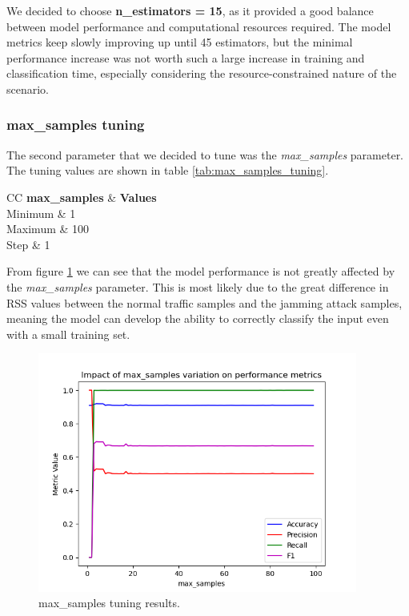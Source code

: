 \documentclass[futureinternet,article,submit,pdftex,moreauthors]{Definitions/mdpi}
\begin{document}
We decided to choose \textbf{n\_estimators = 15}, as it provided a good balance between model performance and computational resources required.
The model metrics keep slowly improving up until 45 estimators, but the minimal performance increase was not worth such a large increase in training and classification time, especially considering the resource-constrained nature of the scenario. 

\subsubsection{max\_samples tuning}

The second parameter that we decided to tune was the \textit{max\_samples} parameter. The tuning values are shown in table \ref{tab:max_samples_tuning}.

\begin{table}[H]
	\caption{max\_samples tuning values.}\label{tab:max_samples_tuning}
	\begin{tabularx}{\textwidth}{CC}
	\toprule
	\textbf{max\_samples} & \textbf{Values} \\
	\midrule
	Minimum & 1 \\
	Maximum & 100 \\
	Step & 1 \\
	\bottomrule
\end{tabularx}
\end{table}

From figure \ref{fig:max_samples_tuning} we can see that the model performance is not greatly affected by the \textit{max\_samples} parameter. This is most likely due to the great difference in RSS values between the normal traffic samples and the jamming attack samples, meaning the model can develop the ability to correctly classify the input even with a small training set.

\begin{figure}[H]
	\includegraphics[width=10.5cm]{img/maxSamplesTuning.png}
	\caption{max\_samples tuning results.}\label{fig:max_samples_tuning}
\end{figure}
\unskip
\end{document}
